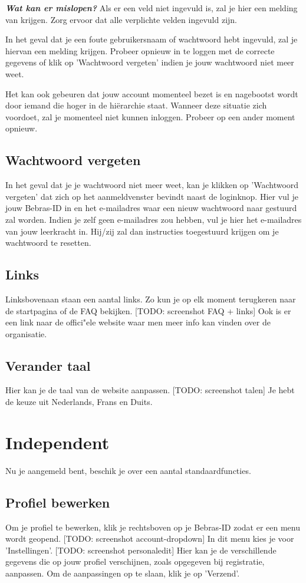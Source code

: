 \documentclass[]{article}
\begin{document}
\textbf{\textit{Wat kan er mislopen?}}
Als er een veld niet ingevuld is, zal je hier een melding van krijgen. Zorg ervoor dat alle verplichte velden ingevuld zijn.

In het geval dat je een foute gebruikersnaam of wachtwoord hebt ingevuld, zal je hiervan een melding krijgen. Probeer opnieuw in te loggen met de correcte gegevens of klik op 'Wachtwoord vergeten' indien je jouw wachtwoord niet meer weet.

Het kan ook gebeuren dat jouw account momenteel bezet is en nagebootst wordt door iemand die hoger in de hiërarchie staat. Wanneer deze situatie zich voordoet, zal je momenteel niet kunnen inloggen. Probeer op een ander moment opnieuw.

\subsection{Wachtwoord vergeten}
In het geval dat je je wachtwoord niet meer weet, kan je klikken op 'Wachtwoord vergeten' dat zich op het aanmeldvenster bevindt naast de loginknop. Hier vul je jouw Bebras-ID in en het e-mailadres waar een nieuw wachtwoord naar gestuurd zal worden. Indien je zelf geen e-mailadres zou hebben, vul je hier het e-mailadres van jouw leerkracht in. Hij/zij zal dan instructies toegestuurd krijgen om je wachtwoord te resetten.

\subsection{Links}
Linksbovenaan staan een aantal links. Zo kun je op elk moment terugkeren naar de startpagina of de FAQ bekijken. [TODO: screenshot FAQ + links] Ook is er een link naar de offici"ele website waar men meer info kan vinden over de organisatie.

\subsection{Verander taal}
Hier kan je de taal van de website aanpassen. [TODO: screenshot talen] Je hebt de keuze uit Nederlands, Frans en Duits.

\section{Independent}

Nu je aangemeld bent, beschik je over een aantal standaardfuncties.

\subsection{Profiel bewerken}
Om je profiel te bewerken, klik je rechtsboven op je Bebras-ID zodat er een menu wordt geopend. [TODO: screenshot account-dropdown] In dit menu kies je voor 'Instellingen'. [TODO: screenshot personaledit] Hier kan je de verschillende gegevens die op jouw profiel verschijnen, zoals opgegeven bij registratie, aanpassen. Om de aanpassingen op te slaan, klik je op 'Verzend'.
\end{document}
